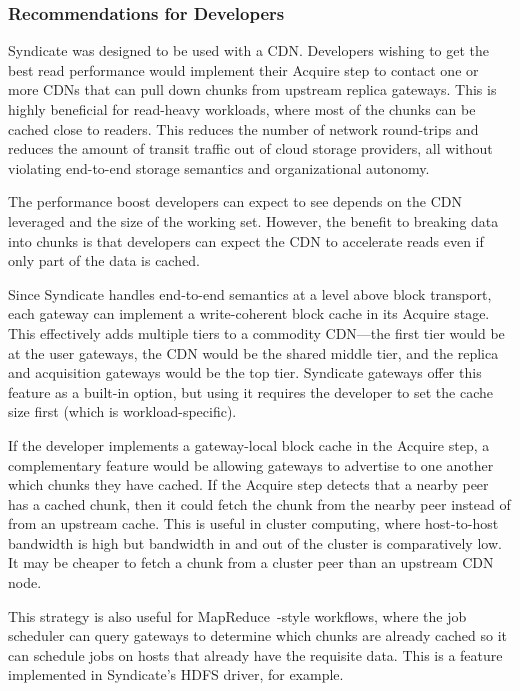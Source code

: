 \subsubsection{Recommendations for Developers}


Syndicate was designed to be used with a CDN.  Developers wishing to get the
best read performance would implement their Acquire step to contact one or more
CDNs that can pull down chunks from upstream replica gateways.  This is highly
beneficial for read-heavy workloads, where most of the chunks can be cached
close to readers.  This reduces the number of network round-trips and reduces
the amount of transit traffic out of cloud storage providers, all without
violating end-to-end storage semantics and organizational autonomy.

The performance boost developers can expect to see depends on the CDN leveraged
and the size of the working set.
However, the benefit to breaking data into chunks is that
developers can expect the CDN to accelerate reads even if only
part of the data is cached.


Since Syndicate handles end-to-end semantics at a level above block transport,
each gateway can implement a write-coherent block cache in its Acquire stage. 
This effectively adds multiple tiers to a commodity CDN---the first tier would be at the user
gateways, the CDN would be the shared middle tier, and the replica and acquisition
gateways would be the top tier.  Syndicate gateways offer this feature as a
built-in option, but using it requires the developer to set the cache size first
(which is workload-specific).


If the developer implements a gateway-local block cache in the Acquire step, a
complementary feature would be allowing gateways to advertise to one another
which chunks they have cached.  If the Acquire step detects that a nearby peer
has a cached chunk, then it could fetch the chunk from the nearby peer instead
of from an upstream cache.  This is useful in cluster computing, where
host-to-host bandwidth is high but bandwidth in and out of the cluster is
comparatively low.  It may be cheaper to fetch a chunk from a cluster peer than
an upstream CDN node.

This strategy is also useful for MapReduce~\cite{mapreduce}-style
workflows, where the job scheduler can query gateways to determine
which chunks are already cached so it can schedule jobs on hosts that already
have the requisite data.  This is a feature implemented in Syndicate's HDFS driver, for
example.

